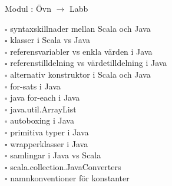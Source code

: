 
Modul : Övn  $\rightarrow$ Labb 
\begin{multicols}{3}\SlideFontTiny
$\square$ syntaxskillnader mellan Scala och Java \\
$\square$ klasser i Scala vs Java \\
$\square$ referensvariabler vs enkla värden i Java \\
$\square$ referenstilldelning vs värdetilldelning i Java \\
$\square$ alternativ konstruktor i Scala och Java \\
$\square$ for-sats i Java \\
$\square$ java for-each i Java \\
$\square$ java.util.ArrayList \\
$\square$ autoboxing i Java \\
$\square$ primitiva typer i Java \\
$\square$ wrapperklasser i Java \\
$\square$ samlingar i Java vs Scala \\
$\square$ scala.collection.JavaConverters \\
$\square$ namnkonventioner för konstanter \\     
\end{multicols}
